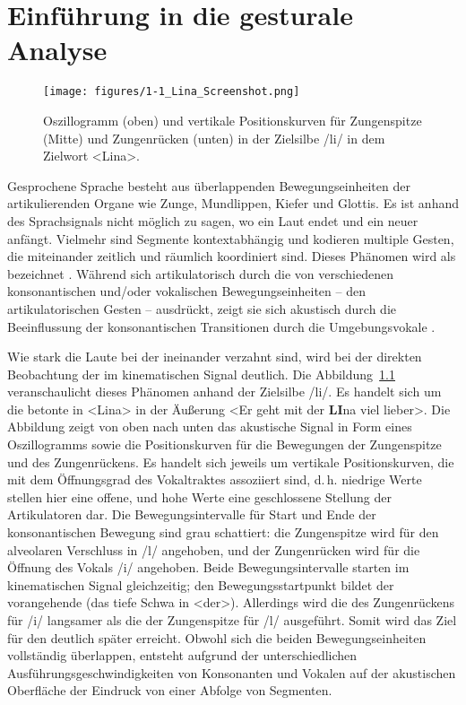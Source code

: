 \chapter{Einführung in die gesturale Analyse}
\label{chap:01}

\largerpage[2]
\begin{figure}[b]
	\texttt{[image: figures/1-1\_Lina\_Screenshot.png]}
	\caption{Oszillogramm (oben) und vertikale Positionskurven für Zungenspitze (Mitte) und Zungenrücken (unten) in der Zielsilbe /li/ in dem Zielwort <Lina>.}
	\label{figure:0101}
\end{figure}
Gesprochene Sprache besteht aus überlappenden Bewegungseinheiten der artikulierenden Organe wie Zunge, Mundlippen, Kiefer und Glottis. Es ist anhand des Sprachsignals nicht möglich zu sagen, wo ein Laut endet und ein neuer anfängt. Vielmehr sind Segmente kontextabhängig und kodieren multiple Gesten, die miteinander zeitlich und räumlich koordiniert sind. Dieses Phänomen wird als  bezeichnet \citep{Menzerath1933, Mattingly1981, Farnetani1999}. Während sich  artikulatorisch durch die  von verschiedenen konsonantischen und/oder vokalischen Bewegungseinheiten -- den artikulatorischen Gesten -- ausdrückt, zeigt sie sich akustisch durch die Beeinflussung der konsonantischen Transitionen durch die Umgebungsvokale \citep{Öhman1966}.

Wie stark die Laute bei der  ineinander verzahnt sind, wird bei der direkten Beobachtung der  im kinematischen Signal deutlich. Die Abbildung~\ref{figure:0101} veranschaulicht dieses Phänomen anhand der Zielsilbe /li/. Es handelt sich um die betonte  in <Lina> in der Äußerung <Er geht mit der \textbf{LI}na viel lieber>. Die Abbildung zeigt von oben nach unten das akustische Signal in Form eines Oszillogramms sowie die Positionskurven für die Bewegungen der Zungenspitze und des Zungenrückens. Es handelt sich jeweils um vertikale Positionskurven, die mit dem Öffnungsgrad des Vokaltraktes assoziiert sind, d.\,h. niedrige Werte stellen hier eine offene, und hohe Werte eine geschlossene Stellung der Artikulatoren dar. Die Bewegungsintervalle für Start und Ende der konsonantischen Bewegung sind grau schattiert: die Zungenspitze wird für den alveolaren Verschluss in /l/ angehoben, und der Zungenrücken wird für die Öffnung des Vokals /i/ angehoben. Beide Bewegungsintervalle starten im kinematischen Signal gleichzeitig; den Bewegungsstartpunkt bildet der vorangehende  (das tiefe Schwa in <der>). Allerdings wird die  des Zungenrückens für /i/ langsamer als die der Zungenspitze für /l/ ausgeführt. Somit wird das Ziel für den  deutlich später erreicht. Obwohl sich die beiden Bewegungseinheiten vollständig überlappen, entsteht aufgrund der unterschiedlichen Ausführungsgeschwindigkeiten von Konsonanten und Vokalen auf der akustischen Oberfläche der Eindruck von einer Abfolge von Segmenten.


